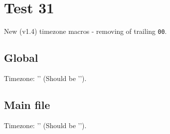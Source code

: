 \documentclass[12pt]{report}
\begin{document}
\chapter{Test 31}
New (v1.4) timezone macros - removing of trailing \verb|00|.

\section{Global}
Timezone:   '' (Should be '\svntimezone').\\
%

\section{Main file}
Timezone:   '' (Should be '\svnfiletimezone').\\
%



\end{document}
